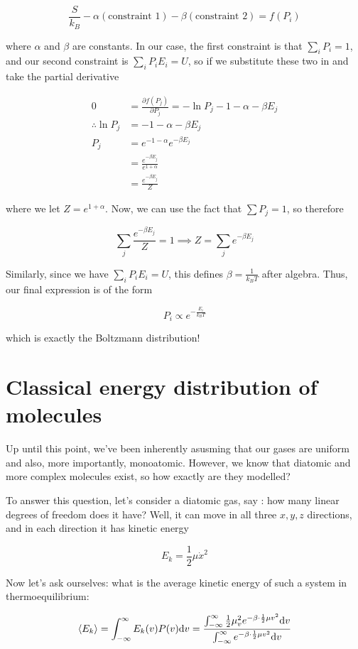 \[\frac{S}{k_B} - \alpha \left(\text{constraint 1}\right) - \beta \left(\text{constraint 2}\right) = f(P_i)\] 

where $\alpha$ and $\beta$ are constants. In our case, the first constraint is that $\sum_i P_i = 1$, and our second constraint is $\sum_i P_i E_i = U$, so if we substitute these two in and take the partial derivative

\begin{align*}
    0 &= \frac{\partial f(P_j)}{\partial P_j} = -\ln P_j - 1 - \alpha - \beta E_j\\
    \therefore \ln P_j &= -1 - \alpha - \beta E_j\\
    P_j &= e^{-1 - \alpha} e^{-\beta E_j}\\
    &= \frac{e^{-\beta E_j}}{e^{1 + \alpha}}\\
    &= \frac{e^{-\beta E_j}}{Z}
\end{align*}

where we let $Z = e^{1 + \alpha}$. Now, we can use the fact that $\sum P_j = 1$, so therefore 

\[ \sum_j \frac{e^{-\beta E_j}}{Z} = 1 \implies Z = \sum_j e^{-\beta E_j}\]

Similarly, since we have $\sum_i P_i E_i = U$, this defines $\beta = \frac{1}{k_BT}$ after algebra. Thus, our final expression is of the form 

\[ P_i \propto e^{-\frac{E_i}{k_BT}}\] 

which is exactly the Boltzmann distribution! 

\section{Classical energy distribution of molecules} 

Up until this point, we've been inherently asusming that our gases are uniform and also, more importantly, monoatomic. However, we know that diatomic and more complex molecules exist, so how exactly are they modelled? 

To answer this question, let's consider a diatomic gas, say : how many linear degrees of freedom does it have? Well, it can move in all three $x, y, z$ directions, and in each direction it has kinetic energy

\[ E_k = \frac12 \mu \dot x^2\] 

Now let's ask ourselves: what is the average kinetic energy of such a system in thermoequilibrium: 
    
\[ \langle E_k \rangle = \int_{-\infty}^{\infty} E_k(v) P(v) \dd v = \frac{\int_{-\infty}^{\infty} \frac 12 \mu_v^2 e^{-\beta \cdot \frac 12 \mu v^2} \dd v}{\int_{-\infty}^{\infty} e^{-\beta \cdot \frac 12 \mu v^2} \dd v}\]

